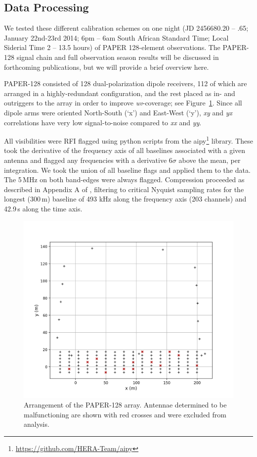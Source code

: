 \subsection{Data Processing}
\label{sec:polcal_data}

We tested these different calibration schemes on one night (JD 2456680.20 -- .65; January 22nd-23rd 2014; 6pm -- 6am South African Standard Time; Local Siderial Time 2 -- 13.5 hours) of PAPER 128-element observations. The PAPER-128 signal chain and full observation season results will be discussed in forthcoming publications, but we will provide a brief overview here. 

PAPER-128 consisted of 128 dual-polarization dipole receivers, 112 of which are arranged in a highly-redundant configuration, and the rest placed as in- and outriggers to the array in order to improve \textit{uv}-coverage; see Figure~\ref{fig:polcal_realarray}. Since all dipole arms were oriented North-South (`x') and East-West (`y'), \textit{xy} and \textit{yx} correlations have very low signal-to-noise compared to \textit{xx} and \textit{yy}.

All visibilities were RFI flagged using {\sc python} scripts from the {\sc aipy}\footnote{\url{https://github.com/HERA-Team/aipy}} library. These took the derivative of the frequency axis of all baselines associated with a given antenna and flagged any frequencies with a derivative 6$\sigma$ above the mean, per integration. We took the union of all baseline flags and applied them to the data. The 5\,MHz on both band-edges were always flagged. Compression proceeded as described in Appendix A of \cite{Parsons.14}, filtering to critical Nyquist sampling rates for the longest (300\,m) baseline of 493 kHz along the frequency axis (203 channels) and 42.9\,s along the time axis. 

\begin{figure}
\centering
\includegraphics[scale=0.5]{chapters/polcal/figures/gridlayout.png}
\caption[Arrangement of the PAPER-128 array.]{Arrangement of the PAPER-128 array. Antennae determined to be malfunctioning are shown with red crosses and were excluded from analysis.}
\label{fig:polcal_realarray}
\end{figure}


